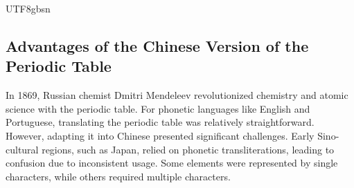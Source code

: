 \documentclass[conference]{IEEEtran}
\begin{document}
\begin{CJK*}{UTF8}{gbsn}

\subsection{Advantages of the Chinese Version of the Periodic Table} 

In 1869, Russian chemist Dmitri Mendeleev revolutionized chemistry and atomic science with the periodic table. For phonetic languages like English and Portuguese, translating the periodic table was relatively straightforward. However, adapting it into Chinese presented significant challenges. Early Sino-cultural regions, such as Japan, relied on phonetic transliterations, leading to confusion due to inconsistent usage. Some elements were represented by single characters, while others required multiple characters. %


\end{CJK*}
\end{document}
